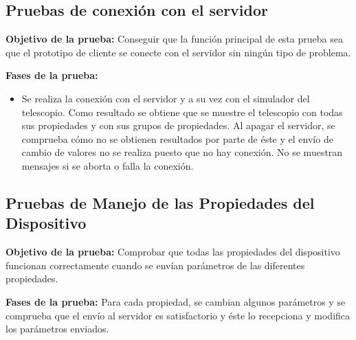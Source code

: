 \subsection{Pruebas de conexión con el servidor}
\textbf{Objetivo de la prueba:} Conseguir que la función principal de esta prueba sea que el prototipo de cliente se conecte con el servidor sin ningún tipo de problema.

\textbf{Fases de la prueba:}
\begin{itemize}
  \item Se realiza la conexión con el servidor y a su vez con el simulador del telescopio. Como resultado se obtiene que se muestre el telescopio con todas sus propiedades y con sus grupos de propiedades. Al apagar el servidor, se comprueba cómo no se obtienen resultados por parte de éste y el envío de cambio de valores no se realiza puesto que no hay conexión. No se muestran mensajes si se aborta o falla la conexión.
\end{itemize}

\subsection{Pruebas de Manejo de las Propiedades del Dispositivo}
\textbf{Objetivo de la prueba:} Comprobar que todas las propiedades del dispositivo funcionan correctamente cuando se envían parámetros de las diferentes propiedades.

\textbf{Fases de la prueba:}
Para cada propiedad, se cambian algunos parámetros y se comprueba que el envío al servidor es satisfactorio y éste lo recepciona y modifica los parámetros enviados.

